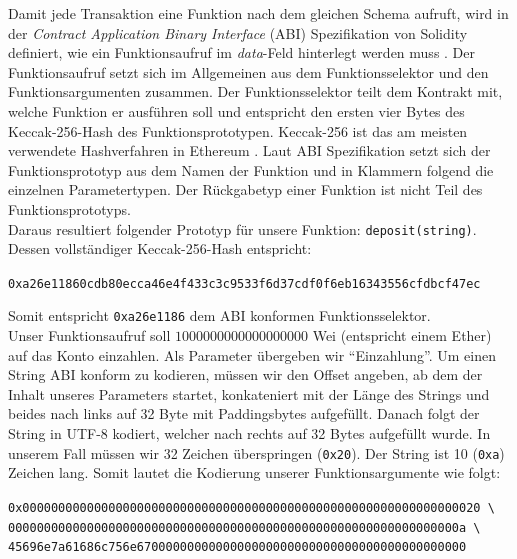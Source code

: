 \documentclass[runningheads]{llncs}
\begin{document}
Damit jede Transaktion eine Funktion nach dem gleichen Schema aufruft, wird in der \textit{Contract Application Binary Interface} (ABI) Spezifikation von Solidity definiert, wie ein Funktionsaufruf im \textit{data}-Feld hinterlegt werden muss \cite{noauthor_contract_nodate}.
Der Funktionsaufruf setzt sich im Allgemeinen aus dem Funktionsselektor und den Funktionsargumenten zusammen. Der Funktionsselektor teilt dem Kontrakt mit, welche Funktion er ausführen soll und entspricht den ersten vier Bytes des Keccak-256-Hash des Funktionsprototypen. Keccak-256 ist das am meisten verwendete Hashverfahren in Ethereum \cite[S. 3]{wood_ethereum/yellowpaper_2019}. Laut ABI Spezifikation setzt sich der Funktionsprototyp aus dem Namen der Funktion und in Klammern folgend die einzelnen Parametertypen. Der Rückgabetyp einer Funktion ist nicht Teil des Funktionsprototyps.\\
Daraus resultiert folgender Prototyp für unsere Funktion: \verb+deposit(string)+.
Dessen vollständiger Keccak-256-Hash entspricht:

\begingroup
\fontsize{9pt}{10pt}\selectfont
\begin{center}
  \verb+0xa26e11860cdb80ecca46e4f433c3c9533f6d37cdf0f6eb16343556cfdbcf47ec+
\end{center}
\endgroup

Somit entspricht \verb+0xa26e1186+ dem ABI konformen Funktionsselektor.\\
Unser Funktionsaufruf soll $1000000000000000000$ Wei (entspricht einem Ether) auf das Konto einzahlen. Als Parameter übergeben wir "`Einzahlung"'. Um einen String ABI konform zu kodieren, müssen wir den Offset angeben, ab dem der Inhalt unseres Parameters startet, konkateniert mit der Länge des Strings und beides nach links auf 32 Byte mit Paddingsbytes aufgefüllt. Danach folgt der String in UTF-8 kodiert, welcher nach rechts auf 32 Bytes aufgefüllt wurde. In unserem Fall müssen wir 32 Zeichen überspringen (\texttt{0x20}). Der String ist 10 (\texttt{0xa}) Zeichen lang. Somit lautet die Kodierung unserer Funktionsargumente wie folgt:

\begingroup
\fontsize{9pt}{10pt}\selectfont
\begin{center}
  \texttt{0x0000000000000000000000000000000000000000000000000000000000000020 \textbackslash} \\
  \texttt{000000000000000000000000000000000000000000000000000000000000000a \textbackslash} \\
  \texttt{45696e7a61686c756e6700000000000000000000000000000000000000000000}
\end{center}
\endgroup
\end{document}
